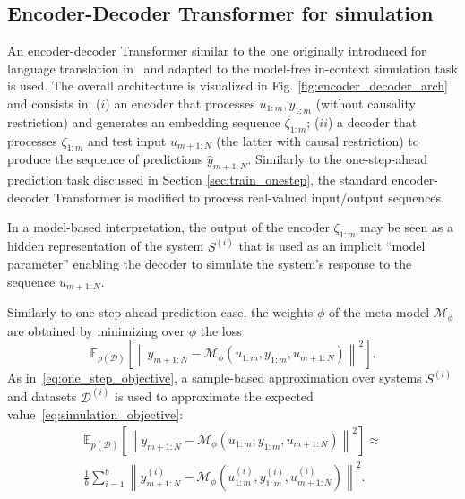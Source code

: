 \documentclass{article}
\newcommand{\sys}{S}
\newcommand{\free}{\mathcal{M}}
\newcommand{\D}{\mathcal{D}}
\newcommand{\nsamp}{N}
\newcommand{\norm}[1]{\left\lVert#1\right\rVert}
\newcommand{\E}{\mathbb{E}}
\begin{document}
\subsection{Encoder-Decoder Transformer for simulation}
\label{sec:train_sim}
An encoder-decoder Transformer similar to the one originally introduced for language translation in~\cite{vaswani2017attention} and adapted to the model-free in-context simulation task is used. The overall architecture is visualized in Fig. \ref{fig:encoder_decoder_arch} and consists in: ($i$) an encoder that processes 
$u_{1:m}, y_{1:m}$ (without causality restriction) and generates an embedding sequence $\zeta_{1:{m}}$; ($ii$) a decoder  that processes $\zeta_{1:{m}}$ and test input  $u_{m+1:\nsamp}$ (the latter with causal restriction) to produce the 
sequence of predictions $\hat y_{m+1:\nsamp}$.
Similarly to the one-step-ahead prediction task discussed in Section \ref{sec:train_onestep}, the standard encoder-decoder Transformer is modified to process  real-valued input/output sequences. 


In a model-based interpretation, the output of the encoder $\zeta_{1:{m}}$ may be seen as a hidden  representation of the system $\sys^{(i)}$ that is used as an implicit ``model parameter'' enabling the decoder to simulate the system's response to the sequence $u_{m+1:\nsamp}$. 

Similarly to  one-step-ahead prediction case, the  weights $\phi$ of the meta-model $\free_{\phi}$ are obtained by minimizing over $\phi$  the loss 
\begin{equation}
	\label{eq:simulation_objective}
     \E_{p(\D)} 
    \left [ 
    \norm{y_{m+1:\nsamp} -  \free_\phi (u_{1:m}, y_{1:m}, u_{m+1:\nsamp})
    }^2
    \right ].
\end{equation}
As in~\eqref{eq:one_step_objective}, a sample-based approximation over systems $\sys^{(i)}$ 
and  datasets $\D^{(i)}$  is used to approximate the expected value~\eqref{eq:simulation_objective}:
\begin{multline}
	\label{eq:simulation_objective_samples}
     \E_{p(\D)} 
    \left [ 
    \norm{y_{m+1:\nsamp} -  \free_\phi (u_{1:m}, y_{1:m}, u_{m+1:\nsamp})
    }^2
    \right ]
    \approx \\
    \frac{1}{b}
    \sum_{i=1}^b
    \norm{y_{m+1:\nsamp}^{(i)} - \free_\phi (u_{1:m}^{(i)}, y_{1:m}^{(i)}, u_{m+1:\nsamp}^{(i)})}^2
    .
\end{multline}
\end{document}
